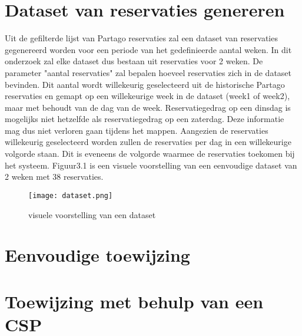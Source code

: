 \section{Dataset van reservaties genereren}
Uit de gefilterde lijst van Partago reservaties zal een dataset van reservaties gegenereerd worden voor een periode van het gedefinieerde aantal weken. In dit onderzoek zal elke dataset dus bestaan uit reservaties voor 2 weken. De parameter "aantal reservaties" zal bepalen hoeveel reservaties zich in de dataset bevinden. Dit aantal wordt willekeurig geselecteerd uit de historische Partago reservaties en gemapt op een willekeurige week in de dataset (week1 of week2), maar met behoudt van de dag van de week. Reservatiegedrag op een dinsdag is mogelijks niet hetzelfde als reservatiegedrag op een zaterdag. Deze informatie mag dus niet verloren gaan tijdens het mappen. Aangezien de reservaties willekeurig geselecteerd worden zullen de reservaties per dag in een willekeurige volgorde staan. Dit is eveneens de volgorde waarmee de reservaties toekomen bij het systeem. Figuur3.1 is een visuele voorstelling van een eenvoudige dataset van 2 weken met 38 reservaties.
\begin{figure}[h]
	\texttt{[image: dataset.png]}
	\caption{visuele voorstelling van een dataset}
\end{figure}
\section{Eenvoudige toewijzing}
\section{Toewijzing met behulp van een CSP}





